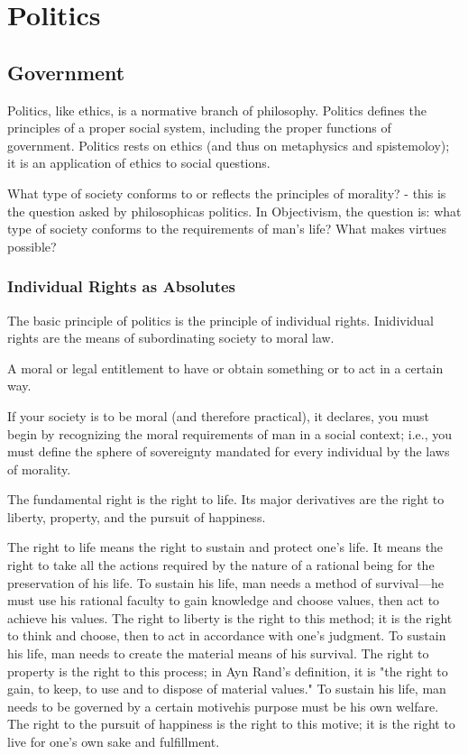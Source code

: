 \part{Politics}
\label{part:politics}

\chapter{Government}

    Politics, like ethics, is a normative branch of philosophy. Politics defines the principles of a proper social system, including the proper functions of government. Politics rests on ethics (and thus on metaphysics and spistemoloy); it is an application of ethics to social questions.

    What type of society conforms to or reflects the principles of morality? - this is the question asked by philosophicas politics. In Objectivism, the question is: what type of society conforms to the requirements of man's life? What makes virtues possible?

    \section{Individual Rights as Absolutes}

        The basic principle of politics is the principle of individual rights. Inidividual rights are the means of subordinating society to moral law.

        \begin{definition}[Right]
            A moral or legal entitlement to have or obtain something or to act in a certain way.
        \end{definition}

        If your society is to be moral (and therefore practical), it declares, you must begin by recognizing the moral requirements of man in a social context; i.e., you must define the sphere of sovereignty mandated for every individual by the laws of morality.

        The fundamental right is the right to life. Its major derivatives are the right to liberty, property, and the pursuit of happiness.

        The right to life means the right to sustain and protect one's life. It means the right to take all the actions required by the nature of a rational being for the preservation of his life. To sustain his life, man needs a method of survival—he must use his rational faculty to gain knowledge and choose values, then act to achieve his values. The right to liberty is the right to this method; it is the right to think and choose, then to act in accordance with one's judgment. To sustain his life, man needs to create the material means of his survival. The right to property is the right to this process; in Ayn Rand's definition, it is "the right to gain, to keep, to use and to dispose of material values." To sustain his life, man needs to be governed by a certain motivehis purpose must be his own welfare. The right to the pursuit of happiness is the right to this motive; it is the right to live for one's own sake and fulfillment.

